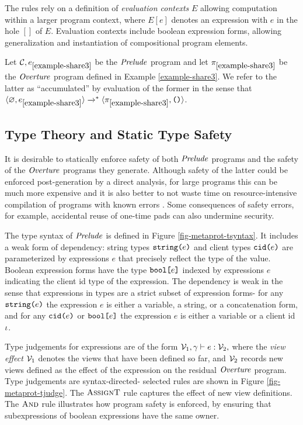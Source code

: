 The rules rely on a definition of \emph{evaluation contexts} $E$
allowing computation within a larger program context, where $E[e]$
denotes an expression with $e$ in the hole $[]$ of $E$. Evaluation
contexts include boolean expression forms, allowing generalization
and instantiation of compositional program elements.
\begin{example}
  \label{example-share3-eval}
  Let $\mathcal{C},e_{\ref{example-share3}}$ be the $\mathit{Prelude}$ program and let 
  $\pi_{\ref{example-share3}}$ be the  $\mathit{Overture}$ program defined
  in Example \ref{example-share3}. We refer to the latter as ``accumulated''
  by evaluation of the former in the sense that $\langle \varnothing,e_{\ref{example-share3}} \rangle
  \xrightarrow{}^{*} \langle \pi_{\ref{example-share3}},\texttt{()} \rangle$.
\end{example}

\subsection{Type Theory and Static Type Safety}

It is desirable to statically enforce safety of both $\mathit{Prelude}$
programs and the safety of the $\mathit{Overture}$ programs they
generate. Although safety of the latter could be enforced
post-generation by a direct analysis, for large programs this can be
much more expensive and it is also better to not waste time on
resource-intensive compilation of programs with known errors
\cite{kreuter2012billion}. Some consequences of safety errors, for example, accidental
reuse of one-time pads can also undermine security.

The type syntax of $\mathit{Prelude}$ is defined in Figure
\ref{fig-metaprot-tsyntax}. It includes a weak form of dependency:
string types $\texttt{string(}e\texttt{)}$ and client types $\texttt{cid(}e\texttt{)}$
are parameterized by expressions $e$ that precisely reflect the
type of the value. Boolean expression forms have the type
$\texttt{bool[}e\texttt{]}$ indexed by expressions $e$ indicating the client
id type of the expression. The dependency is weak in the
sense that expressions in types are a strict subset of
expression forms- for any $\texttt{string(}e\texttt{)}$ the expression $e$
is either a variable, a string, or a concatenation form,
and for any $\texttt{cid(}e\texttt{)}$ or $\texttt{bool[}e\texttt{]}$ the expression $e$
is either a variable or a client id $\iota$. 

Type judgements for expressions are of the form
$\tjudge{\viewst_1}{\gamma}{e}{\viewst_2}$ where the \emph{view
effect} $\mathcal{V}_1$ denotes the views that have been defined so far,
and $\mathcal{V}_2$ records new views defined as the effect of the
expression on the residual $\mathit{Overture}$ program.  Type judgements are
syntax-directed- selected rules are shown in Figure
\ref{fig-metaprot-tjudge}. The $\text{\sc AssignT}$ rule
captures the effect of new view definitions. The
$\text{\sc And}$ rule illustrates how program safety is enforced,
by ensuring that subexpressions of boolean expressions have the
same owner.

